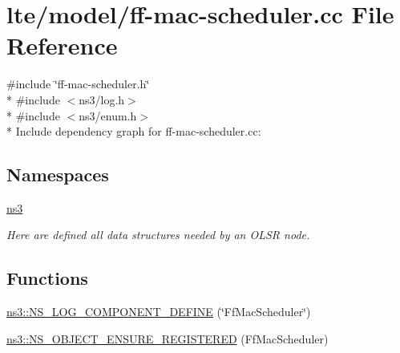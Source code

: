 \hypertarget{ff-mac-scheduler_8cc}{}\section{lte/model/ff-\/mac-\/scheduler.cc File Reference}
\label{ff-mac-scheduler_8cc}
{\ttfamily \#include \char`\"{}ff-\/mac-\/scheduler.\+h\char`\"{}}\\*
{\ttfamily \#include $<$ns3/log.\+h$>$}\\*
{\ttfamily \#include $<$ns3/enum.\+h$>$}\\*
Include dependency graph for ff-\/mac-\/scheduler.cc\+:
\subsection*{Namespaces}
\begin{DoxyCompactItemize}
\item 
 \hyperlink{namespacens3}{ns3}
\begin{DoxyCompactList}\small\item\em Here are defined all data structures needed by an O\+L\+SR node. \end{DoxyCompactList}\end{DoxyCompactItemize}
\subsection*{Functions}
\begin{DoxyCompactItemize}
\item 
\hyperlink{namespacens3_a815e770f1ace17683ed640646f0a648b}{ns3\+::\+N\+S\+\_\+\+L\+O\+G\+\_\+\+C\+O\+M\+P\+O\+N\+E\+N\+T\+\_\+\+D\+E\+F\+I\+NE} (\char`\"{}Ff\+Mac\+Scheduler\char`\"{})
\item 
\hyperlink{namespacens3_a5c7f2a2fa35a4af9653c0e937129c9cc}{ns3\+::\+N\+S\+\_\+\+O\+B\+J\+E\+C\+T\+\_\+\+E\+N\+S\+U\+R\+E\+\_\+\+R\+E\+G\+I\+S\+T\+E\+R\+ED} (Ff\+Mac\+Scheduler)
\end{DoxyCompactItemize}
